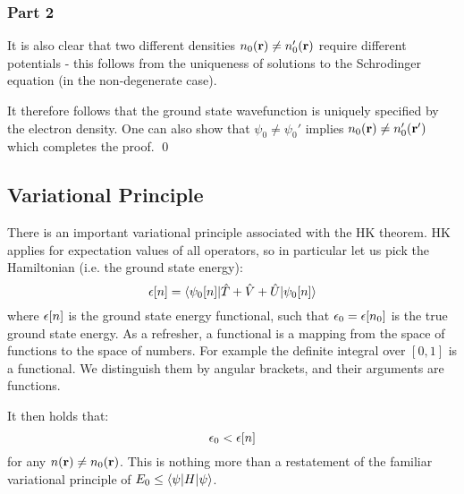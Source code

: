 \subsubsection{Part 2}
It is also clear that two different densities $n_0(\mathbf{r}) \neq n_0'(\mathbf{r})$ require different potentials - this follows from the uniqueness of solutions to the Schrodinger equation (in the non-degenerate case). 

It therefore follows that the ground state wavefunction is uniquely specified by the electron density. One can also show that $\psi_0 \neq \psi_0'$ implies $n_0(\mathbf{r}) \neq n_0'(\mathbf{r}')$ which completes the proof. \qed

\subsection{Variational Principle}
There is an important variational principle associated with the HK theorem. HK applies for expectation values of all operators, so in particular let us pick the Hamiltonian (i.e. the ground state energy):
\begin{equation}
    \epsilon[n] = \langle \psi_0[n] \rvert\hat{T} + \hat{V} + \hat{U}\lvert \psi_0[n] \rangle
\end{equation}
where $\epsilon[n]$ is the ground state energy functional, such that $\epsilon_0 = \epsilon[n_0]$ is the true ground state energy. As a refresher, a functional is a mapping from the space of functions to the space of numbers. For example the definite integral over $[0, 1]$ is a functional. We distinguish them by angular brackets, and their arguments are functions. 

It then holds that:
\begin{equation}
    \epsilon_0 < \epsilon[n]
\end{equation}
for any $n(\mathbf{r}) \neq n_0(\mathbf{r})$. This is nothing more than a restatement of the familiar variational principle of $E_0 \leq \langle \psi \rvert H\lvert \psi \rangle$. 


